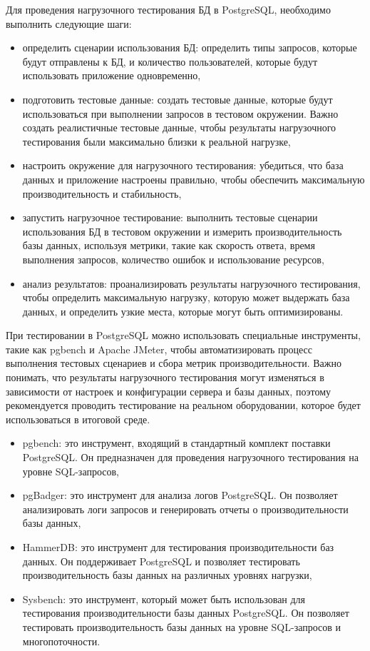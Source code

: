 Для проведения нагрузочного тестирования БД в PostgreSQL, необходимо выполнить следующие шаги:

\begin{itemize}
    \item определить сценарии использования БД: определить типы запросов, которые будут отправлены к БД, и количество пользователей, которые будут использовать приложение одновременно,
    \item подготовить тестовые данные: создать тестовые данные, которые будут использоваться при выполнении запросов в тестовом окружении. Важно создать реалистичные тестовые данные, чтобы результаты нагрузочного тестирования были максимально близки к реальной нагрузке,
    \item настроить окружение для нагрузочного тестирования: убедиться, что база данных и приложение настроены правильно, чтобы обеспечить максимальную производительность и стабильность,
    \item запустить нагрузочное тестирование: выполнить тестовые сценарии использования БД в тестовом окружении и измерить производительность базы данных, используя метрики, такие как скорость ответа, время выполнения запросов, количество ошибок и использование ресурсов,
    \item анализ результатов: проанализировать результаты нагрузочного тестирования, чтобы определить максимальную нагрузку, которую может выдержать база данных, и определить узкие места, которые могут быть оптимизированы.
\end{itemize}

При тестировании в PostgreSQL можно использовать специальные инструменты, такие как pgbench и Apache JMeter, чтобы автоматизировать процесс выполнения тестовых сценариев и сбора метрик производительности. Важно понимать, что результаты нагрузочного тестирования могут изменяться в зависимости от настроек и конфигурации сервера и базы данных, поэтому рекомендуется проводить тестирование на реальном оборудовании, которое будет использоваться в итоговой среде.

\begin{itemize}
    \item pgbench: это инструмент, входящий в стандартный комплект поставки PostgreSQL. Он предназначен для проведения нагрузочного тестирования на уровне SQL-запросов,
    \item pgBadger: это инструмент для анализа логов PostgreSQL. Он позволяет анализировать логи запросов и генерировать отчеты о производительности базы данных,
    \item HammerDB: это инструмент для тестирования производительности баз данных. Он поддерживает PostgreSQL и позволяет тестировать производительность базы данных на различных уровнях нагрузки,
    \item Sysbench: это инструмент, который может быть использован для тестирования производительности базы данных PostgreSQL. Он позволяет тестировать производительность базы данных на уровне SQL-запросов и многопоточности.
\end{itemize}

